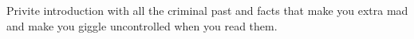 Privite introduction with all the criminal past and facts that make you extra mad and make you giggle uncontrolled when you read them.
